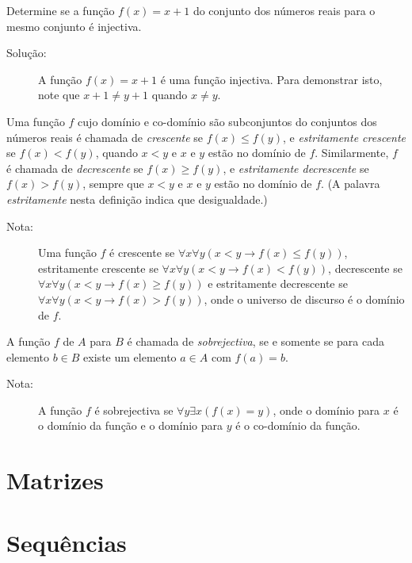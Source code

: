 \begin{exmp}
\label{exem331}
Determine se a função $f(x)=x+1$ do conjunto dos números reais para o mesmo
conjunto é injectiva.
\begin{description}
\item[Solução:]A função $f(x)=x+1$ é uma função injectiva. Para demonstrar isto,
note que $x+1 \neq y+1$ quando $x \neq y$.
\end{description}
\end{exmp}

\begin{defn}
\label{def321}
Uma função $f$ cujo domínio e co-domínio são subconjuntos do conjuntos dos
números reais é chamada de \emph{crescente} se $f(x) \leq f(y)$, e
\emph{estritamente crescente} se $f(x) < f(y)$, quando $x<y$ e $x$ e $y$ estão
no domínio de $f$.
Similarmente, $f$ é chamada de \emph{decrescente} se $f(x) \geq f(y)$, e
\emph{estritamente decrescente} se $f(x) > f(y)$, sempre que $x<y$ e $x$ e $y$
estão no domínio de $f$. (A palavra \emph{estritamente} nesta definição indica
que desigualdade.)
\end{defn}

\begin{description}
\item[Nota:]Uma função $f$ é crescente se $\forall x\forall y(x<y \to f(x) \leq
f(y))$, estritamente crescente se $\forall x\forall y(x<y \to f(x) < f(y))$,
decrescente se $\forall x\forall y(x<y \to f(x) \geq f(y))$ e estritamente
decrescente se $\forall x\forall y(x<y \to f(x) > f(y))$, onde o universo de
discurso é o domínio de $f$.
\end{description}

\begin{defn}
\label{def322}
A função $f$ de $A$ para $B$ é chamada de \emph{sobrejectiva}, se e somente se
para cada elemento $b \in B$ existe um elemento $a \in A$ com $f(a)=b$.

\begin{description}
\item[Nota:]A função $f$ é sobrejectiva se $\forall y\exists x(f(x)=y)$, onde o
domínio para $x$ é o domínio da função e o domínio para $y$ é o co-domínio da
função.
\end{description}
\end{defn}

\section{Matrizes}
\section{Sequências}